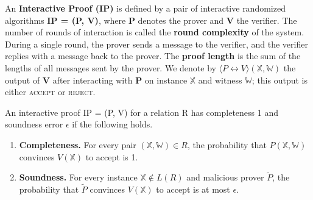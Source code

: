 \begin{definition}
An \textbf{Interactive Proof (IP)} is defined by a pair of interactive randomized
algorithms \textbf{IP = (P, V)}, where \textbf{P} denotes the prover and \textbf{V} the verifier. 
The number of rounds of interaction is called the \textbf{round complexity} of the system. 
During a single round, the prover sends a message to the verifier, and the verifier replies with a message back to the prover. 
The \textbf{proof length} is the sum of the lengths of all messages sent by the prover.
We denote by $\langle P \leftrightarrow V \rangle (\mathbb{X}, \mathbb{W})$ the output of \textbf{V} after interacting with \textbf{P} on instance $\mathbb{X}$ and witness $\mathbb{W}$; this output is either \textsc{accept} or \textsc{reject}.

An interactive proof IP = (P, V) for a relation R has completeness 1 and soundness error $\epsilon$ if the following holds.

\begin{enumerate}
    \item \textbf{Completeness.}
    For every pair $(\mathbb{X}, \mathbb{W}) \in R$, the probability that $P(\mathbb{X}, \mathbb{W})$ convinces $V(\mathbb{X})$ to accept is 1.
    
    \item \textbf{Soundness.}
    For every instance $\mathbb{X} \not\in L(R)$ and malicious prover $\tilde{P}$, the probability that $\tilde{P}$ convinces $V(\mathbb{X})$ to accept is at most $\epsilon$.
\end{enumerate}
\end{definition}

